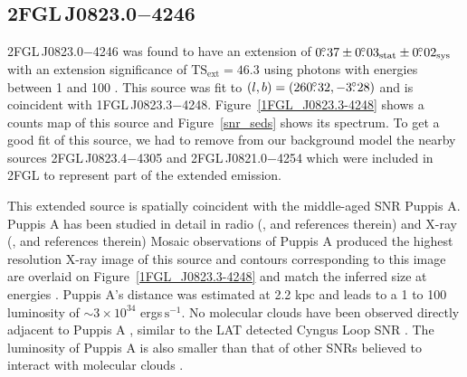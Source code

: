 \documentclass[12pt,preprint]{aastex}
\newcommand{\gev}{\text{GeV}\xspace}
\newcommand{\s}{\text{s}\xspace}
\newcommand{\tsext}{{\ensuremath{\text{TS}_{\text{ext}}}}\xspace}
\newcommand{\rosat}{\text{{\em ROSAT}}\xspace}
\newcommand{\sys}{\text{sys}\xspace}
\newcommand{\stat}{\text{stat}\xspace}
\begin{document}
\subsection{2FGL\,J0823.0$-$4246}
\label{section_2FGL_J0823.0-4246}


2FGL\,J0823.0$-$4246 was found 
to have an 
extension of $0\fdg37\pm0\fdg03_\stat\pm0\fdg02_\sys$ 
with an extension
significance of $\tsext=46.3$
using 
 photons with energies between
1 \gev and 100 \gev.  This source was fit to 
$(l,b)=(260\mbox{$.\!\!^\circ$}32,-3\mbox{$.\!\!^\circ$}28)$ and
is coincident with 1FGL\,J0823.3$-$4248.
Figure~\ref{1FGL_J0823.3-4248} shows a
counts map of this source
and Figure~\ref{snr_seds} shows its spectrum.
To get a good fit of this source, we had to remove from our background
model the nearby sources 2FGL\,J0823.4$-$4305 and 2FGL\,J0821.0$-$4254
which were included in 2FGL to represent part of the
extended emission.  

This extended source is spatially coincident with the
middle-aged SNR Puppis A.  Puppis A has been studied in detail
in radio (\cite{puppis_a_vla}, and references therein) and  X-ray
(\cite{rosat_puppis_a,suzaku_puppis_a}, and references therein) Mosaic
\rosat observations of Puppis A produced the highest resolution X-ray
image of this source and contours corresponding to this image are
overlaid on Figure~\ref{1FGL_J0823.3-4248} and match the inferred
size at \gev energies \citep{rosat_puppis_a}.  Puppis A's distance
was estimated at 2.2 kpc \citep{reynoso_1995,reynoso_2003} and leads
to a 1 \gev to 100 \gev luminosity of $\sim 3\times 10^{34}$ ergs$\,\s^{-1}$.
No molecular clouds have been observed directly adjacent to Puppis A
\citep{co_eastern_puppis_a}, similar to the LAT detected Cyngus
Loop SNR \citep{cygnus_loop_lat}.  The luminosity of Puppis A is also
smaller than that of other SNRs believed to interact with molecular clouds
\citep{w51c,ic443,w44,w28,w49b_lat}.
\end{document}
